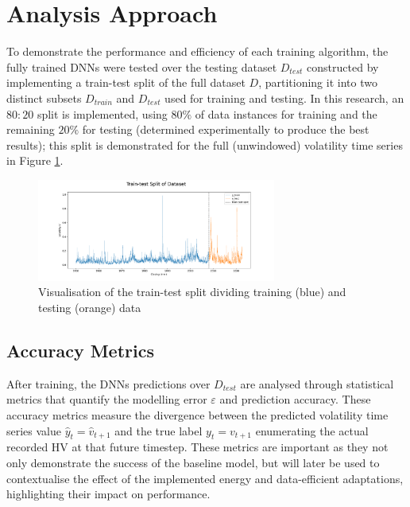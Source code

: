 \documentclass[a4paper, 11pt]{report}
\begin{document}
    \section{Analysis Approach}
    \label{section: metrics}

    To demonstrate the performance and efficiency of each training algorithm, the fully trained DNNs were tested over the testing dataset $D_{test}$ constructed by implementing a train-test split of the full dataset $D$, partitioning it into two distinct subsets $D_{train}$ and $D_{test}$ used for training and testing. In this research, an $80 \colon 20$ split is implemented, using $80\%$ of data instances for training and the remaining $20\%$ for testing (determined experimentally to produce the best results); this split is demonstrated for the full (unwindowed) volatility time series in Figure \ref{fig: traintest-split}.


    \begin{figure}[ht]
        \centering
        \includegraphics[width=0.7\textwidth]{traintest-split.png}
        \caption{\centering Visualisation of the train-test split dividing training (blue) and testing (orange) data}
        \label{fig: traintest-split}
    \end{figure}


    \subsection{Accuracy Metrics}
    \label{section: accuracy-metrics}

    After training, the DNNs predictions over $D_{test}$ are analysed through statistical metrics that quantify the modelling error $\varepsilon$ and prediction accuracy. These accuracy metrics measure the divergence between the predicted volatility time series value $\hat{y}_t = \hat{v}_{t+1}$ and the true label $y_t = v_{t+1}$ enumerating the actual recorded HV at that future timestep. These metrics are important as they not only demonstrate the success of the baseline model, but will later be used to contextualise the effect of the implemented energy and data-efficient adaptations, highlighting their impact on performance. 
\end{document}
